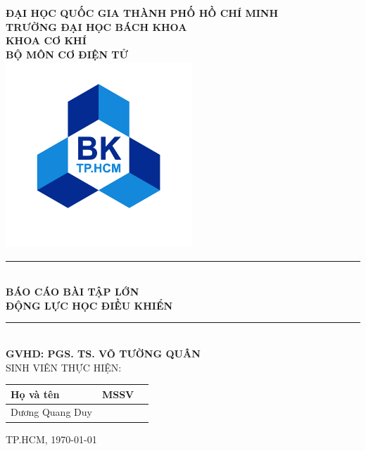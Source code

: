 \begin{titlepage}   
    \begin{center}
        \vspace*{-2cm} 
        \large
        \textbf{ĐẠI HỌC QUỐC GIA THÀNH PHỐ HỒ CHÍ MINH \\
        TRƯỜNG ĐẠI HỌC BÁCH KHOA\\
        KHOA CƠ KHÍ\\
        BỘ MÔN CƠ ĐIỆN TỬ}\\
        \includegraphics[width=70mm, height=70mm]{pictures/hcmut.png} \\
        \rule{\linewidth}{0.5mm}\\
        \vspace{0.8cm}
        \Large
        \textbf{BÁO CÁO BÀI TẬP LỚN}\\
        \vspace*{0.5cm}
        \Huge
        \textbf{ĐỘNG LỰC HỌC ĐIỀU KHIỂN}\\
        \vspace{0.5cm}
        \rule{\linewidth}{0.5mm}\\
        \vspace{0.8cm}
        \vspace{1cm}
        \large
        \textbf{GVHD: PGS. TS. VÕ TƯỜNG QUÂN}\\
        \vspace{0.5cm}
        SINH VIÊN THỰC HIỆN:\\[0.3cm]
        \begin{tabular}{|>{\centering\arraybackslash}m{5cm}|>{\centering\arraybackslash}m{7cm}|>{\centering\arraybackslash}m{5cm}|}
            \hline
             \textbf{Họ và tên} & \textbf{MSSV} \\
            \hline
             Dương Quang Duy & 2210497 \\
            \hline
        \end{tabular}
    \end{center}
        
    \vfill
    \large
    \begin{center}
        TP.HCM, \today
    \end{center}
\end{titlepage}
